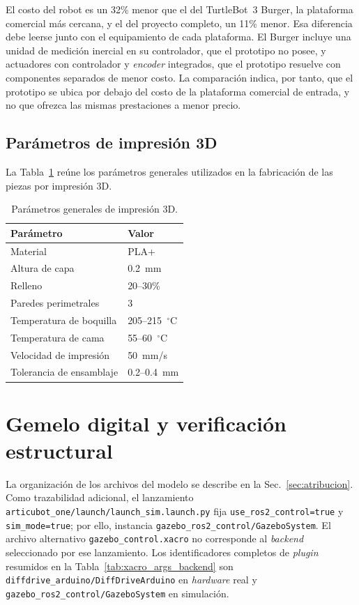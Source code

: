 \begin{appendices}
El costo del robot es un 32\% menor que el del TurtleBot~3 Burger, la
plataforma comercial más cercana, y el del proyecto completo, un 11\% menor. Esa diferencia
debe leerse junto con el equipamiento de cada plataforma. El Burger incluye
una unidad de medición inercial en su controlador, que el prototipo no posee,
y actuadores con controlador y \textit{encoder} integrados, que el prototipo resuelve
con componentes separados de menor costo. La comparación indica, por tanto,
que el prototipo se ubica por debajo del costo de la plataforma comercial de
entrada, y no que ofrezca las mismas prestaciones a menor precio.

\subsection{Parámetros de impresión 3D}
\label{anx:impresion3d}

La Tabla~\ref{tab:anx_print_params} reúne los parámetros generales utilizados
en la fabricación de las piezas por impresión 3D.

\begin{table}[H]
\centering
\caption{Parámetros generales de impresión 3D.}
\label{tab:anx_print_params}
\small
\begin{tabular}{ll}
\toprule
\textbf{Parámetro} & \textbf{Valor} \\
\midrule
Material & PLA+ \\
Altura de capa & 0.2~mm \\
Relleno & 20--30\% \\
Paredes perimetrales & 3 \\
Temperatura de boquilla & 205--215~$^\circ$C \\
Temperatura de cama & 55--60~$^\circ$C \\
Velocidad de impresión & 50~mm/s \\
Tolerancia de ensamblaje & 0.2--0.4~mm \\
\bottomrule
\end{tabular}
\end{table}

\section{Gemelo digital y verificación estructural}
\label{anx:gemelo_digital}

La organización de los archivos del modelo se describe en la
Sec.~\ref{sec:atribucion}. Como trazabilidad adicional, el lanzamiento
\texttt{articubot\_one/launch/launch\_sim.launch.py} fija
\texttt{use\_ros2\_control=true} y \texttt{sim\_mode=true}; por ello,
instancia \texttt{gazebo\_ros2\_control/GazeboSystem}. El archivo alternativo
\texttt{gazebo\_control.xacro} no corresponde al \textit{backend} seleccionado por
ese lanzamiento. Los identificadores completos de \textit{plugin} resumidos en la
Tabla~\ref{tab:xacro_args_backend} son
\texttt{diffdrive\_arduino/DiffDriveArduino} en \textit{hardware} real y
\texttt{gazebo\_ros2\_control/GazeboSystem} en simulación.


\end{appendices}
